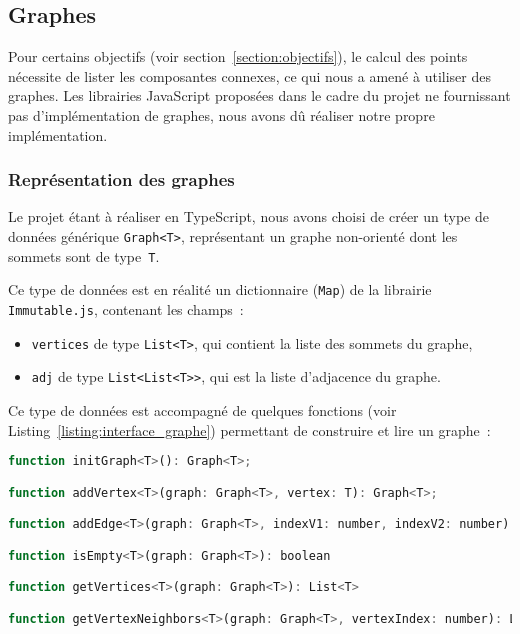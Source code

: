 \subsection{Graphes}

Pour certains objectifs (voir section~\ref{section:objectifs}), le calcul des points nécessite de lister les composantes connexes, ce qui nous a amené à utiliser des graphes.
Les librairies JavaScript proposées dans le cadre du projet ne fournissant pas d'implémentation de graphes, nous avons dû réaliser notre propre implémentation.

\subsubsection{Représentation des graphes}

Le projet étant à réaliser en TypeScript, nous avons choisi de créer un type de données générique \texttt{Graph<T>}, représentant un graphe non-orienté dont les sommets sont de type~\texttt{T}.

Ce type de données est en réalité un dictionnaire (\texttt{Map}) de la librairie \texttt{Immutable.js}, contenant les champs~:

\begin{itemize}
    \item \texttt{vertices} de type \texttt{List<T>}, qui contient la liste des sommets du graphe,
    \item \texttt{adj} de type \texttt{List<List<T>{>}}, qui est la liste d'adjacence du graphe.
\end{itemize}


Ce type de données est accompagné de quelques fonctions (voir Listing~\ref{listing:interface_graphe}) permettant de construire et lire un graphe~:

\begin{lstlisting}[language=JavaScript, caption = Interface du type \texttt{Graph<T>}, label=listing:interface_graphe]
function initGraph<T>(): Graph<T>;

function addVertex<T>(graph: Graph<T>, vertex: T): Graph<T>;

function addEdge<T>(graph: Graph<T>, indexV1: number, indexV2: number): Graph<T>;

function isEmpty<T>(graph: Graph<T>): boolean

function getVertices<T>(graph: Graph<T>): List<T>

function getVertexNeighbors<T>(graph: Graph<T>, vertexIndex: number): List<T>
\end{lstlisting}


